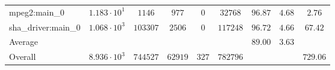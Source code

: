 \begin{tabular}{|l|c|c|c|c|c|c|c|c|}
mpeg2:main\_0           & $ 1.183 \cdot 10^{1} $ & $ 1146   $ & $ 977   $ & $ 0   $ & $ 32768  $ & $ 96.87       $ & $ 4.68    $ & $ 2.76    $ \\
sha\_driver:main\_0     & $ 1.068 \cdot 10^{3} $ & $ 103307 $ & $ 2506  $ & $ 0   $ & $ 117248 $ & $ 96.72       $ & $ 4.66    $ & $ 67.42   $ \\
\hline
Average                 & $                    $ & $        $ & $       $ & $     $ & $        $ & $ 89.00       $ & $ 3.63    $ & $         $ \\
\hline
Overall                 & $ 8.936 \cdot 10^{3} $ & $ 744527 $ & $ 62919 $ & $ 327 $ & $ 782796 $ & $             $ & $         $ & $ 729.06  $ \\
\hline
\end{tabular}
